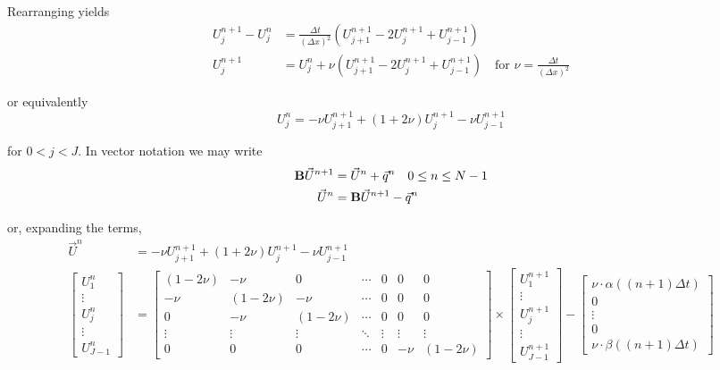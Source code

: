 \documentclass[12pt]{article}
\begin{document}
Rearranging yields
\begin{align*}
	U^{n + 1}_j - U^n_j &= \frac{\Delta t}{(\Delta x)^2} \left( U^{n + 1}_{j + 1} - 2U^{n + 1}_j + U^{n + 1}_{j - 1} \right) \\
	U^{n + 1}_j &= U^n_j + \nu \left( U^{n + 1}_{j + 1} - 2U^{n + 1}_j + U^{n + 1}_{j - 1} \right) \quad \text{for } \nu = \frac{\Delta t}{(\Delta x)^2}
\end{align*}

or equivalently
\begin{equation*}
	U^n_j = -\nu U^{n + 1}_{j + 1} + (1 + 2\nu)U^{n + 1}_j - \nu U^{n + 1}_{j - 1}
\end{equation*}

for $0 < j < J$. In vector notation we may write
\begin{align*}
	{\bf B} \vec{U}^{n + 1} &= \vec{U}^n + \vec{q}^n \quad 0 \leq n \leq N - 1 \\
	\vec{U}^n &= {\bf B}\vec{U}^{n + 1} - \vec{q}^n
\end{align*}

or, expanding the terms,
\begin{align*}
	\vec{U}^n &=  -\nu U^{n + 1}_{j + 1} + (1 + 2\nu)U^{n + 1}_j - \nu U^{n + 1}_{j - 1} \\
	\begin{bmatrix}
		U^n_1 \\
		\vdots \\
		U^n_j \\
		\vdots \\
		U^n_{J - 1}
	\end{bmatrix} 
	&=
	\begin{bmatrix}
		(1 - 2\nu) & -\nu & 0 & \cdots & 0 & 0 & 0 \\
		-\nu & (1 - 2\nu) & -\nu & \cdots & 0 & 0 & 0 \\
		0 & -\nu & (1 - 2\nu) & \cdots & 0 & 0 & 0 \\
		\vdots & \vdots & \vdots & \ddots & \vdots & \vdots & \vdots \\
		0 & 0 & 0 & \cdots & 0 & -\nu & (1 - 2\nu) 
	\end{bmatrix} \times
	\begin{bmatrix}
		U^{n + 1}_1 \\
		\vdots \\
		U^{n + 1}_j \\
		\vdots \\
		U^{n + 1}_{J - 1}
	\end{bmatrix} - 
	\begin{bmatrix}
		\nu \cdot \alpha( (n + 1)\Delta t ) \\
		0 \\
		\vdots \\
		0 \\
		\nu \cdot \beta( (n + 1)\Delta t )
	\end{bmatrix}
\end{align*}
\end{document}
